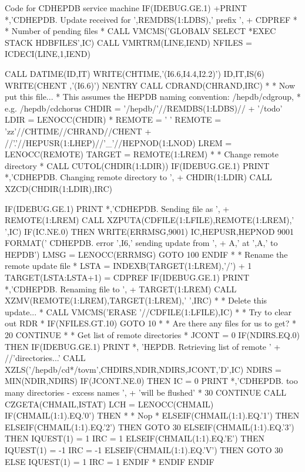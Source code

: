 \begin{XMPt}{Code for CDHEPDB service machine}
      IF(IDEBUG.GE.1)
     +PRINT *,'CDHEPDB. Update received for ',REMDBS(1:LDBS),' prefix ',
     +         CDPREF
*
*     Number of pending files
*
      CALL VMCMS('GLOBALV SELECT *EXEC STACK HDBFILES',IC)
      CALL VMRTRM(LINE,IEND)
      NFILES = ICDECI(LINE,1,IEND)
 
      CALL DATIME(ID,IT)
      WRITE(CHTIME,'(I6.6,I4.4,I2.2)') ID,IT,IS(6)
      WRITE(CHENT ,'(I6.6)') NENTRY
      CALL CDRAND(CHRAND,IRC)
*
*    Now put this file...
*    This assumes the HEPDB naming convention: /hepdb/cdgroup,
*                                          e.g. /hepdb/cdchorus
      CHDIR  = '/hepdb/'//REMDBS(1:LDBS)//
     +         '/todo'
      LDIR   = LENOCC(CHDIR)
*
      REMOTE = ' '
      REMOTE = 'zz'//CHTIME//CHRAND//CHENT
     +         //'.'//HEPUSR(1:LHEP)//'_'//HEPNOD(1:LNOD)
      LREM   = LENOCC(REMOTE)
      TARGET = REMOTE(1:LREM)
*
*     Change remote directory
*
      CALL CUTOL(CHDIR(1:LDIR))
      IF(IDEBUG.GE.1) PRINT *,'CDHEPDB. Changing remote directory to ',
     +   CHDIR(1:LDIR)
      CALL XZCD(CHDIR(1:LDIR),IRC)
 
      IF(IDEBUG.GE.1) PRINT *,'CDHEPDB. Sending file as ',
     +   REMOTE(1:LREM)
      CALL XZPUTA(CDFILE(1:LFILE),REMOTE(1:LREM),' ',IC)
      IF(IC.NE.0) THEN
         WRITE(ERRMSG,9001) IC,HEPUSR,HEPNOD
 9001    FORMAT(' CDHEPDB. error ',I6,' sending update from ',
     +            A,' at ',A,' to HEPDB')
         LMSG = LENOCC(ERRMSG)
         GOTO 100
      ENDIF
*
*     Rename the remote update file
*
      LSTA = INDEXB(TARGET(1:LREM),'/') + 1
      TARGET(LSTA:LSTA+1) = CDPREF
      IF(IDEBUG.GE.1) PRINT *,'CDHEPDB. Renaming file to ',
     +   TARGET(1:LREM)
      CALL XZMV(REMOTE(1:LREM),TARGET(1:LREM),' ',IRC)
*
*     Delete this update...
*
      CALL VMCMS('ERASE '//CDFILE(1:LFILE),IC)
*
*     Try to clear out RDR
*
      IF(NFILES.GT.10) GOTO 10
*
*     Are there any files for us to get?
*
   20 CONTINUE
*
*     Get list of remote directories
*
      JCONT  = 0
      IF(NDIRS.EQ.0) THEN
         IF(IDEBUG.GE.1) PRINT *, 'HEPDB. Retrieving list of remote '
     +   //'directories...'
         CALL XZLS('/hepdb/cd*/tovm',CHDIRS,NDIR,NDIRS,JCONT,'D',IC)
         NDIRS = MIN(NDIR,NDIRS)
         IF(JCONT.NE.0) THEN
            IC = 0
            PRINT *,'CDHEPDB. too many directories - excess names ',
     +      'will be flushed'
*
   30       CONTINUE
            CALL CZGETA(CHMAIL,ISTAT)
            LCH = LENOCC(CHMAIL)
            IF(CHMAIL(1:1).EQ.'0') THEN
*
*        Nop
*
            ELSEIF(CHMAIL(1:1).EQ.'1') THEN
            ELSEIF(CHMAIL(1:1).EQ.'2') THEN
               GOTO 30
            ELSEIF(CHMAIL(1:1).EQ.'3') THEN
               IQUEST(1) = 1
               IRC = 1
            ELSEIF(CHMAIL(1:1).EQ.'E') THEN
               IQUEST(1) = -1
               IRC = -1
            ELSEIF(CHMAIL(1:1).EQ.'V') THEN
               GOTO 30
            ELSE
               IQUEST(1) = 1
               IRC = 1
            ENDIF
*
         ENDIF
      ENDIF
 

\end{XMPt}
